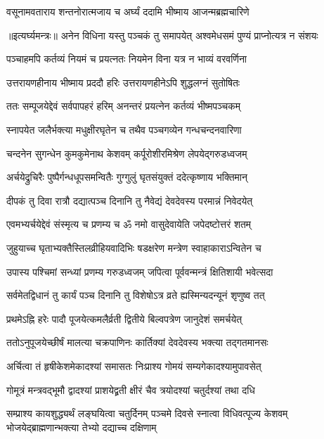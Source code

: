 \twolineshloka
{वसूनामवताराय शन्तनोरात्मजाय च}
{अर्घ्यं ददामि भीष्माय आजन्मब्रह्मचारिणे} %


॥इत्यर्घ्यमन्त्रः॥
\twolineshloka
{अनेन विधिना यस्तु पञ्चकं तु समापयेत्}
{अश्वमेधसमं पुण्यं प्राप्नोत्यत्र न संशयः} %

\twolineshloka
{पञ्चाहमपि कर्तव्यं नियमं च प्रयत्नतः}
{नियमेन विना यत्र न भाव्यं वरवर्णिना} %

\twolineshloka
{उत्तरायणहीनाय भीष्माय प्रददौ हरिः}
{उत्तरायणहीनेऽपि शुद्धलग्नं सुतोषितः} %

\twolineshloka
{ततः सम्पूजयेद्देवं सर्वपापहरं हरिम्}
{अनन्तरं प्रयत्नेन कर्तव्यं भीष्मपञ्चकम्} %

\twolineshloka
{स्नापयेत जलैर्भक्त्या मधुक्षीरघृतेन च}
{तथैव पञ्चगव्येन गन्धचन्दनवारिणा} %

\twolineshloka
{चन्दनेन सुगन्धेन कुमकुमेनाथ केशवम्}
{कर्पूरोशीरमिश्रेण लेपयेद्गरुडध्वजम्} %

\twolineshloka
{अर्चयेद्रुचिरैः पुष्पैर्गन्धधूपसमन्वितैः}
{गुग्गुलुं घृतसंयुक्तं ददेत्कृष्णाय भक्तिमान्} %

\twolineshloka
{दीपकं तु दिवा रात्रौ दद्यात्पञ्च दिनानि तु}
{नैवेद्यं देवदेवस्य परमान्नं निवेदयेत्} %

\twolineshloka
{एवमभ्यर्चयेद्देवं संस्मृत्य च प्रणम्य च}
{ॐ नमो वासुदेवायेति जपेदष्टोत्तरं शतम्} %

\twolineshloka
{जुहुयाच्च घृताभ्यक्तैस्तिलव्रीहियवादिभिः}
{षडक्षरेण मन्त्रेण स्वाहाकाराऽन्वितेन च} %

\twolineshloka
{उपास्य पश्चिमां सन्ध्यां प्रणम्य गरुडध्वजम्}
{जपित्वा पूर्ववन्मन्त्रं क्षितिशायी भवेत्सदा} %

\twolineshloka
{सर्वमेतद्विधानं तु कार्यं पञ्च दिनानि तु}
{विशेषोऽत्र व्रते ह्यस्मिन्यदन्यूनं शृणुष्व तत्} %

\twolineshloka
{प्रथमेऽह्नि हरेः पादौ पूजयेत्कमलैर्व्रती}
{द्वितीये बिल्वपत्रेण जानुदेशं समर्चयेत्} %

\twolineshloka
{ततोऽनुपूजयेच्छीर्षं मालत्या चक्रपाणिनः}
{कार्तिक्यां देवदेवस्य भक्त्या तद्गतमानसः} %

\twolineshloka
{अर्चित्वा तं हृषीकेशमेकादश्यां समासतः}
{निःप्राश्य गोमयं सम्यगेकादश्यामुपावसेत्} %

\twolineshloka
{गोमूत्रं मन्त्रवद्भूमौ द्वादश्यां प्राशयेद्व्रती}
{क्षीरं चैव त्रयोदश्यां चतुर्दश्यां तथा दधि} %

\threelineshloka
{सम्प्राश्य कायशुद्ध्यर्थं लङ्घयित्वा चतुर्दिनम्}
{पञ्चमे दिवसे स्नात्वा विधिवत्पूज्य केशवम्}
{भोजयेद्ब्राह्मणान्भक्त्या तेभ्यो दद्याच्च दक्षिणाम्} %


